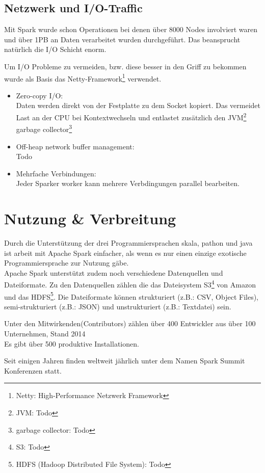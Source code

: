 \subsection{Netzwerk und I/O-Traffic}

Mit Spark wurde schon Operationen bei denen über 8000 Nodes involviert waren und über 1PB an Daten verarbeitet wurden durchgeführt.
Das beansprucht natürlich die I/O Schicht enorm. 


Um I/O Probleme zu vermeiden, bzw. diese besser in den Griff zu bekommen wurde als Basis das Netty-Framework\footnote{Netty: High-Performance Netzwerk Framework} verwendet.
\begin{itemize}
	\item Zero-copy I/O:\\
	Daten werden direkt von der Festplatte zu dem Socket kopiert. Das vermeidet Last an der CPU bei Kontextwechseln und entlastet zusätzlich den JVM\footnote{JVM: Todo} garbage collector\footnote{garbage collector: Todo}
	\item Off-heap network buffer management:\\
	Todo
	\item Mehrfache Verbindungen:\\
	Jeder Sparker worker kann mehrere Verbdingungen parallel bearbeiten.
\end{itemize}


\newpage
\section{Nutzung \& Verbreitung}

Durch die Unterstützung der drei Programmiersprachen skala, pathon und java ist arbeit mit Apache Spark einfacher, als wenn es nur einen einzige exotische Programmiersprache zur Nutzung gäbe. \\
Apache Spark unterstützt zudem noch verschiedene Datenquellen und Dateiformate.  Zu den Datenquellen zählen die das Dateisystem S3\footnote{S3: Todo} von Amazon und das HDFS\footnote{HDFS (Hadoop Distributed File System): Todo}.
Die Dateiformate können strukturiert (z.B.: CSV, Object Files), semi-strukturiert (z.B.: JSON) und unstrukturiert (z.B.: Textdatei) sein.


Unter den Mitwirkenden(Contributors) zählen über 400 Entwickler aus über 100 Unternehmen, Stand 2014 \\
Es gibt über 500 produktive Installationen. %

Seit einigen Jahren finden weltweit jährlich unter dem Namen Spark Summit Konferenzen statt. \cite{SPCOM}\\



